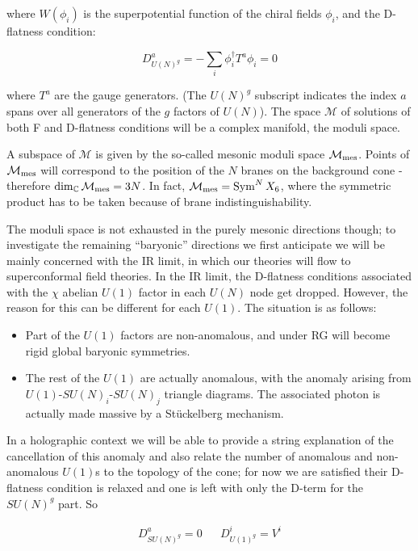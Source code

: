 where $W(\phi_i)$ is the superpotential function of the chiral fields $\phi_i$, and the D-flatness condition:

\begin{equation}
	D^a_{U(N)^g} = - \sum_i \phi_i^\dagger T^a \phi_i = 0
\end{equation}

where $T^a$ are the gauge generators. (The $U(N)^g$ subscript indicates the index $a$ spans over all generators of the $g$ factors of $U(N)$). The space $\mathcal{M}$ of solutions of both F and D-flatness conditions will be a complex manifold, the moduli space.

A subspace of $\mathcal{M}$ is given by the so-called mesonic moduli space $\mathcal{M}_\mathrm{mes}$. Points of $\mathcal{M}_\mathrm{mes}$ will correspond to the position of the $N$ branes on the background cone - therefore $\dim_\mathbb{C} \mathcal{M}_\mathrm{mes} = 3N$. In fact, $\mathcal{M}_\mathrm{mes} = \operatorname{Sym}^N X_6$, where the symmetric product has to be taken because of brane indistinguishability.

The moduli space is not exhausted in the purely mesonic directions though; to investigate the remaining ``baryonic'' directions we first anticipate we will be mainly concerned with the IR limit, in which our theories will flow to superconformal field theories. In the IR limit, the D-flatness conditions associated with the $\chi$ abelian $U(1)$ factor in each $U(N)$ node get dropped. However, the reason for this can be different for each $U(1)$. The situation is as follows:

\begin{itemize}
	\item Part of the $U(1)$ factors are non-anomalous, and under RG will become rigid global baryonic symmetries.
	\item The rest of the $U(1)$ are actually anomalous, with the anomaly arising from $U(1)$-$SU(N)_i$-$SU(N)_j$ triangle diagrams. The associated photon is actually made massive by a St\"uckelberg mechanism\cite{Martelli:sbv}.
\end{itemize}

In a holographic context we will be able to provide a string explanation of the cancellation of this anomaly and also relate the number of anomalous and non-anomalous $U(1)$s to the topology of the cone; for now we are satisfied their D-flatness condition is relaxed and one is left with only the D-term for the $SU(N)^g$ part. So

\begin{align}
	D^a_{SU(N)^g} = 0 && D^i_{U(1)^g} = V^i
	\label{}
\end{align}

